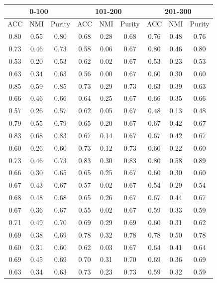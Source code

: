 \documentclass[10pt,final]{IEEEtran}
\begin{document}
\begin{center}
\begin{table}
\begin{tabular}{|c|c|c|c|c|c|c|c|c|}
    \hline
    \multicolumn{3}{|c|}{0-100} & \multicolumn{3}{|c|}{101-200} & \multicolumn{3}{|c|}{201-300}\\
    \hline
    ACC & NMI & Purity & ACC & NMI & Purity & ACC & NMI & Purity\\
    \hline
    0.80 & 0.55 & 0.80 & 0.68 & 0.28 & 0.68 & 0.76 & 0.48 & 0.76\\
    0.73 & 0.46 & 0.73 & 0.58 & 0.06 & 0.67 & 0.80 & 0.46 & 0.80\\
    0.53 & 0.20 & 0.53 & 0.62 & 0.02 & 0.67 & 0.53 & 0.23 & 0.53\\
    0.63 & 0.34 & 0.63 & 0.56 & 0.00 & 0.67 & 0.60 & 0.30 & 0.60\\
    0.85 & 0.59 & 0.85 & 0.73 & 0.29 & 0.73 & 0.63 & 0.39 & 0.63\\
    0.66 & 0.46 & 0.66 & 0.64 & 0.25 & 0.67 & 0.66 & 0.35 & 0.66\\
    0.57 & 0.26 & 0.57 & 0.62 & 0.05 & 0.67 & 0.48 & 0.13 & 0.48\\
    0.79 & 0.55 & 0.79 & 0.65 & 0.20 & 0.67 & 0.67 & 0.42 & 0.67\\
    0.83 & 0.68 & 0.83 & 0.67 & 0.14 & 0.67 & 0.67 & 0.42 & 0.67\\
    0.60 & 0.26 & 0.60 & 0.73 & 0.12 & 0.73 & 0.60 & 0.22 & 0.60\\
    0.73 & 0.46 & 0.73 & 0.83 & 0.30 & 0.83 & 0.80 & 0.58 & 0.89\\
    0.66 & 0.30 & 0.65 & 0.65 & 0.25 & 0.67 & 0.60 & 0.30 & 0.60\\
    0.67 & 0.43 & 0.67 & 0.57 & 0.02 & 0.67 & 0.54 & 0.29 & 0.54\\
    0.68 & 0.48 & 0.68 & 0.65 & 0.26 & 0.67 & 0.67 & 0.44 & 0.67\\
    0.67 & 0.36 & 0.67 & 0.55 & 0.02 & 0.67 & 0.59 & 0.33 & 0.59\\
    0.71 & 0.49 & 0.70 & 0.69 & 0.29 & 0.69 & 0.60 & 0.31 & 0.62\\
    0.69 & 0.38 & 0.69 & 0.78 & 0.32 & 0.78 & 0.78 & 0.50 & 0.78\\
    0.60 & 0.31 & 0.60 & 0.62 & 0.03 & 0.67 & 0.64 & 0.41 & 0.64\\
    0.69 & 0.45 & 0.69 & 0.70 & 0.31 & 0.70 & 0.69 & 0.36 & 0.69\\
    0.63 & 0.34 & 0.63 & 0.73 & 0.23 & 0.73 & 0.59 & 0.32 & 0.59\\

\end{tabular}
\end{table}
\end{center}
\end{document}
